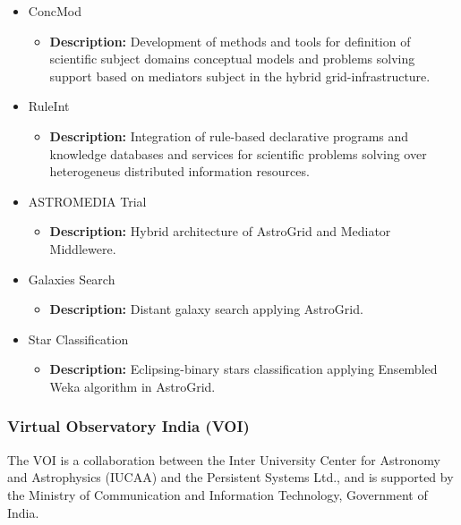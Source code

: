 \documentclass[11pt]{article}
\begin{document}
\begin{itemize}
\begin{itemize}
                            \item ConcMod
                                \begin{itemize}
                                    \item \textbf{Description:} Development of
methods and tools for definition of scientific subject domains conceptual models
and problems solving support based on mediators subject in the hybrid
grid-infrastructure.
                               \end{itemize}
                            \item RuleInt
                                \begin{itemize}
                                    \item \textbf{Description:} Integration of
rule-based declarative programs and knowledge databases and services for
scientific problems solving over heterogeneus distributed information resources.
                               \end{itemize}
                            \item ASTROMEDIA Trial
                                \begin{itemize}
                                    \item \textbf{Description:} Hybrid
architecture of AstroGrid and Mediator Middlewere.
                               \end{itemize}
                            \item Galaxies Search
                                \begin{itemize}
                                    \item \textbf{Description:} Distant galaxy
search applying AstroGrid.
                                \end{itemize}
                            \item Star Classification
                                \begin{itemize}
                                    \item \textbf{Description:}
Eclipsing-binary stars classification applying Ensembled Weka algorithm in
AstroGrid.
                               \end{itemize}
                    \end{itemize}
                \end{itemize}

            \subsubsection{Virtual Observatory India (VOI)}
                The VOI is a collaboration between the Inter University Center
for Astronomy and Astrophysics (IUCAA) and the Persistent Systems Ltd., and is
supported by the Ministry of Communication and Information Technology,
Government of India.
\end{document}

